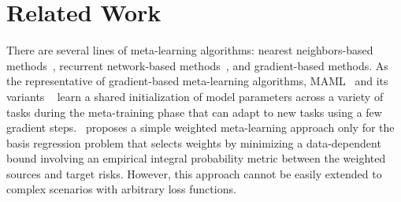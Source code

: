 \vspace{-1ex}
\section{Related Work}
There are several lines of meta-learning algorithms: nearest neighbors-based methods~\citep{vinyals2016matching}, recurrent network-based methods~\citep{ravi2016optimization}, and gradient-based methods. As the representative of gradient-based meta-learning algorithms, MAML~\citep{finn2017model} and its variants ~\citep{finn2018probabilistic, nichol2018first, rusu2018meta,rajeswaran2019meta, behl2019alpha, raghu2019rapid, zhao2020fair, zhou2020meta} learn a shared initialization of model parameters across a variety of tasks during the meta-training phase that can adapt to new tasks using a few gradient steps.~\citet{cai2020weightedmeta} proposes a simple weighted meta-learning approach only for the basis regression problem that selects weights by minimizing a data-dependent bound involving an empirical integral probability metric between the weighted sources and target risks. However, this approach cannot be easily extended to complex scenarios with arbitrary loss functions.

